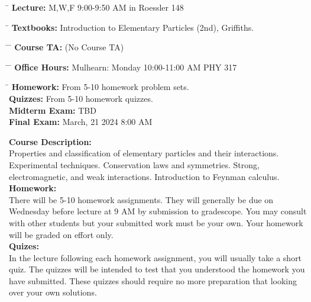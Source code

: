 \documentclass[12pt]{article}
\begin{document}
\noindent
\begin{tabbing}
\hspace*{8em} \= \kill 
\textbf {Lecture:} \> M,W,F 9:00-9:50 AM in Roessler 148 
\end{tabbing}
\noindent
\begin{tabbing}
\hspace*{8em} \= \kill 
\textbf{Textbooks:} \> Introduction to Elementary Particles (2nd), Griffiths.\\
\end{tabbing}
\noindent
\begin{tabbing}
\hspace*{8em}\= \hspace*{10em} \= \kill 
\textbf{Course TA:} \> (No Course TA)
\end{tabbing}
\noindent
\begin{tabbing}
\hspace*{8em}\= \hspace*{10em} \= \kill 
\textbf{Office Hours:}
    \> Mulhearn: \> Monday 10:00-11:00 AM PHY 317
\end{tabbing}
\noindent
\begin{tabbing}
\hspace*{12em}\= \kill 
\textbf{Homework:} \> From 5-10 homework problem sets.\\
\textbf{Quizzes:} \> From 5-10 homework quizzes.\\
\textbf{Midterm Exam:} \> TBD\\
\textbf{Final Exam:} \>  March, 21 2024 8:00 AM\\
\end{tabbing}
\noindent
\textbf {Course Description:}\\
Properties and classification of elementary particles and their interactions. Experimental techniques. Conservation laws and symmetries. Strong, electromagnetic, and weak interactions. Introduction to Feynman calculus.\\[3pt]

\noindent
\textbf{Homework:}\\ There will be 5-10 homework assignments.  They
will generally be due on Wednesday before lecture at 9 AM by
submission to gradescope.  You may consult with other students but
your submitted work must be your own.  Your homework will be graded on
effort only.\\[3pt]

\noindent
\textbf{Quizes:}\\
In the lecture following each homework assignment, you will usually take a short quiz.  The quizzes will be intended to test that you understood the homework you have submitted.  These quizzes should require no more preparation that looking over your own solutions.\\[3pt]
\end{document}
